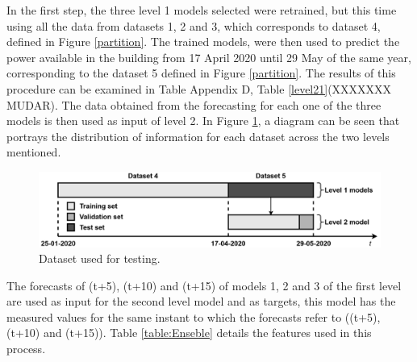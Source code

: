 In the first step, the three level 1 models selected were retrained, but this time using all the data from datasets 1, 2 and 3, which corresponds to dataset 4, defined in Figure \ref{partition}. The trained models, were then used to predict the power available in the building from 17 April 2020 until 29 May of the same year, corresponding to the dataset 5 defined in Figure \ref{partition}. The results of this procedure can be examined in Table Appendix D, Table \ref{level21}(XXXXXXX MUDAR). The data obtained from the forecasting for each one of the three models is then used as input of level 2. In Figure \ref{level22}, a diagram can be seen that portrays the distribution of information for each dataset across the two levels mentioned.

\begin{figure}[h!]
    \centering
    \begin{center}
    \includegraphics[width=1\textwidth]{Images/stage2.png}
    \caption{Dataset used for testing.}
    \label{level22}
    \end{center}
\end{figure}

The forecasts of (t+5), (t+10) and (t+15) of models 1, 2 and 3 of the first level are used as input for the second level model and as targets, this model has the measured values for the same instant to which the forecasts refer to ((t+5), (t+10) and (t+15)). Table \ref{table:Enseble} details the features used in this process.

